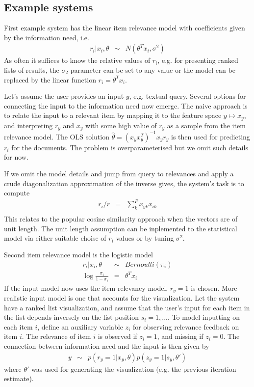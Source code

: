 \documentclass[10pt]{article}
\begin{document}


\subsection{Example systems}
First example system has the linear item relevance model with coefficients given by the information need, i.e.
\begin{eqnarray}
r_i | x_i, \theta & \sim & N(\theta^T x_i, \sigma^2)
\end{eqnarray}
As often it suffices to know the relative values of $r_i$, e.g. for presenting ranked lists of results, the $\sigma_2$ parameter can be set to any value or the model can be replaced by the linear function $r_i = \theta^T x_i$. 

Let's assume the user provides an input $y$, e.g. textual query. Several options for connecting the input to the information need now emerge. The naive approach is to relate the input to a relevant item by mapping it to the feature space $y \mapsto x_{y}$, and interpreting $r_y$ and $x_y$ with some high value of $r_y$ as a sample from the item relevance model. The OLS solution $\hat \theta = (x_y x_y^T)^{-1}x_y r_y$ is then used for predicting $r_i$ for the documents. The problem is overparameterised but we omit such details for now. 

If we omit the model details and jump from query to relevances and apply a crude diagonalization approximation of the inverse gives, the system's task is to compute
\begin{eqnarray}
r_i/r &=& \sum_k^P x_{yk} x_{ik}\\
\end{eqnarray} 
This relates to the popular cosine similarity approach when the vectors are of unit length. The unit length assumption can be inplemented to the statistical model via either suitable choise of $r_i$ values or by tuning $\sigma^2$. 

Second item relevance model is the logistic model
\begin{eqnarray}
r_i | x_i, \theta & \sim & Bernoulli(\pi_i)\\
\log \frac{\pi_i}{1-\pi_i} &=& \theta^T x_i
\end{eqnarray}
If the input model now uses the item relevancy model, $r_y=1$ is chosen. More realistic input model is one that accounts for the visualization. Let the system have a ranked list visualization, and assume that the user's input for each item in the list depends inversely on the list position $s_i=1,...$.  To model inputting on each item $i$, define an auxiliary variable $z_i$ for observing relevance feedback on item $i$. The relevance of item $i$ is observed if $z_i=1$, and missing if $z_i=0$. The connection between information need and the input is then given by 
\begin{eqnarray}
y & \sim & p(r_y=1 | x_y, \theta) p(z_y=1 | s_y, \theta')
\end{eqnarray}
where $\theta'$ was used for generating the visualization (e.g. the previous iteration estimate).  
\end{document}
